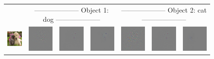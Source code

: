 \setlength{\tabcolsep}{0.5pt}
\begin{figure}
\begin{center}
\begin{tabular}{ccccccc}
& \multicolumn{3}{c}{\small -------------------- Object 1: dog --------------------} & \multicolumn{3}{c}{\small -------------------- Object 2: cat --------------------} \\
\vspace{-2.5pt}
\includegraphics[width=0.14\linewidth,height=0.115\linewidth]{figs/examples/googlenet/oxford/dog-cat1} &
\includegraphics[width=0.14\linewidth,height=0.115\linewidth]{figs/examples/googlenet/oxford/dog-cat1_diff_258} &
\includegraphics[width=0.14\linewidth,height=0.115\linewidth]{figs/examples/googlenet/deconv/dog-cat1_diff_258} &
\includegraphics[width=0.14\linewidth,height=0.115\linewidth]{figs/examples/googlenet/soft/dog-cat1_diff_258} &
\includegraphics[width=0.14\linewidth,height=0.115\linewidth]{figs/examples/googlenet/oxford/dog-cat1_diff_286} &
\includegraphics[width=0.14\linewidth,height=0.115\linewidth]{figs/examples/googlenet/deconv/dog-cat1_diff_286} &
\includegraphics[width=0.14\linewidth,height=0.115\linewidth]{figs/examples/googlenet/soft/dog-cat1_diff_286} \\

\end{tabular}
\end{center}
\end{figure}
